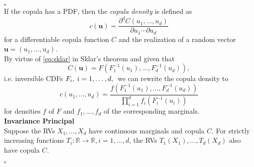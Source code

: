 \hfill $\square$ \\


If the copula has a \ac{PDF}, then the \textit{copula density} is defined as
\begin{equation}
c(\mathbf{u})=\frac{\partial^{d} C\left(u_{1}, \ldots, u_{d}\right)}{\partial u_{1} \cdots \partial u_{d}} 
\label{eq:copula_density_1}
\end{equation}
for a differentiable copula function $C$ and the realization of a random vector $ \bm{u} = (u_1, \ldots, u_d)$.\\

By virtue of \autoref{eq:sklar} in Sklar's theorem and given that
\begin{equation} 
C(\mathbf{u})=F\left(F_{1}^{-1}\left(u_{1}\right), \ldots, F_{d}^{-1}\left(u_{d}\right)\right) ,
\label{eq:sklar_inverse}
\end{equation}
i.e. inversible \ac{CDF}s $ F_i, \hspace{0.25em} i = 1, \ldots, d, \hspace{0.25em}$ we can rewrite the copula density to
\begin{equation}
c\left(u_{1}, \ldots, u_{d}\right)=\frac{f\left(F_{1}^{-1}\left(u_{1}\right), \ldots, F_{d}^{-1}\left(u_{d}\right)\right)}{\prod \limits _{i=1}^{d} f_{i}\left(F_{i}^{-1}\left(u_{i}\right)\right)}
\label{eq:copula_density_2}
\end{equation}
for densities $f$ of $F$ and $f_1, \ldots, f_d$ of the corresponding marginals.\\


\textbf{Invariance Principal}\\
Suppose the \ac{RV}s $ X_1, \ldots, X_d $  have continuous marginals and copula $C$. For strictly increasing functions $T_i : \mathbb{R} \rightarrow \mathbb{R}, i = 1, \ldots, d$, the \ac{RV}s $T_1(X_1), \ldots, T_d(X_d)$ also have copula $C$.

\hfill $\square$ \\


